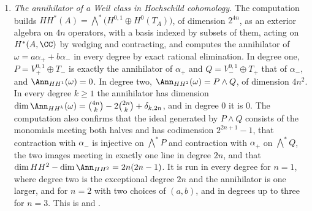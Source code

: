 \begin{enumerate}[label=\textup{(\Roman*)},leftmargin=*]
  strictly increasing and unbounded. This is ,
   and .
\item \emph{The annihilator of a Weil class in Hochschild cohomology.} The
  computation builds $HH^{*}(A)=\bigwedge^{*}\bigl(H^{0,1}\oplus
  H^{0}(T_{A})\bigr)$, of
  dimension $2^{4n}$, as an exterior algebra on $4n$ operators, with a basis
  indexed by subsets of them, acting on $H^{*}(A,\CC)$ by wedging and
  contracting, and computes the annihilator of
  $\omega=a\alpha_{+}+b\alpha_{-}$ in every degree by exact rational
  elimination. In degree one, $P=V_{+}^{0,1}\oplus T_{-}$ is exactly the
  annihilator of $\alpha_{+}$ and $Q=V_{-}^{0,1}\oplus T_{+}$ that of
  $\alpha_{-}$, and $\Ann_{HH^{1}}(\omega)=0$. In degree two,
  $\Ann_{HH^{2}}(\omega)=P\wedge Q$, of dimension $4n^{2}$. In every degree
  $k\ge1$ the annihilator has dimension
  $\dim\Ann_{HH^{k}}(\omega)=\binom{4n}{k}-2\binom{2n}{k}+\delta_{k,2n}$, and
  in degree $0$ it is $0$. The computation also confirms that
  the ideal generated by $P\wedge Q$ consists of the monomials meeting both
  halves and has codimension $2^{2n+1}-1$, that contraction with
  $\alpha_{-}$ is injective on $\bigwedge^{*}P$ and contraction with
  $\alpha_{+}$ on $\bigwedge^{*}Q$, the two images meeting in exactly one
  line in degree $2n$, and that $\dim HH^{2}-\dim\Ann_{HH^{2}}=2n(2n-1)$. It
  is run in every degree for $n=1$, where degree two is the exceptional
  degree $2n$ and the annihilator is one larger, and for $n=2$ with two
  choices of $(a,b)$, and in degrees up to three for $n=3$. This is
   and .


\end{enumerate}

